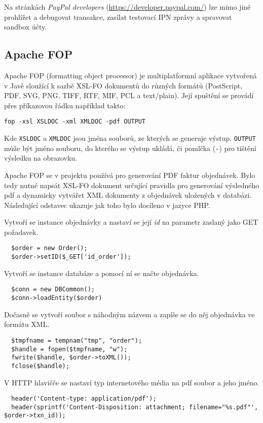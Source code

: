 \documentclass[12pt]{article}
\begin{document}
Na stránkách \emph{PayPal developers} (\url{https://developer.paypal.com/}) lze mimo jiné prohlížet a debugovat transakce, zasílat testovací IPN zprávy a spravovat sandbox účty.

\subsection{Apache FOP}\label{fop}

Apache FOP (formatting object processor) je multiplatformní aplikace vytvořená v Javě sloužící k sazbě XSL-FO dokumentů do různých formátů (PostScript, PDF, SVG, PNG, TIFF, RTF, MIF, PCL a text/plain).
Její spuštění se provádí přes příkazovou řádku například takto:\newline

\texttt{fop -xsl XSLDOC -xml XMLDOC -pdf OUTPUT}\newline

Kde \texttt{XSLDOC} a \texttt{XMLDOC} jsou jména souborů, ze kterých se generuje výstup. \texttt{OUTPUT} může být jméno souboru, do kterého se výstup ukládá, či pomlčka (\texttt{-}) pro tištění výsledku na obrazovku.

Apache FOP se v projektu používá pro generování PDF faktur objednávek. Bylo tedy nutné napsát XSL-FO dokument určující pravidla pro generování výsledného pdf a dynamicky vytvářet XML dokumenty z objednávek uložených v databázi.
Následující odstavec ukazuje jak toho bylo docíleno v jazyce PHP.\newline

\lstset{language=PHP}
Vytvoří se instance objednávky a nastaví se její \emph{id} na parametr zaslaný jako GET požadavek.
\begin{lstlisting}
  $order = new Order();
  $order->setID($_GET['id_order']);
\end{lstlisting}

Vytvoří se instance databáze a pomocí ní se načte objednávka.
\begin{lstlisting}
  $conn = new DBCommon();
  $conn->loadEntity($order)
\end{lstlisting}

Dočasně se vytvoří soubor s náhodným názvem a zapíše se do něj objednávka ve formátu XML.
\begin{lstlisting}
  $tmpfname = tempnam("tmp", "order");
  $handle = fopen($tmpfname, "w");
  fwrite($handle, $order->toXML());
  fclose($handle);
\end{lstlisting}  

V HTTP hlavičče se nastaví typ internetového média na pdf soubor a jeho jméno.
\begin{lstlisting}  
  header('Content-type: application/pdf');
  header(sprintf('Content-Disposition: attachment; filename="%s.pdf"', $order->txn_id));
\end{lstlisting}  
\end{document}
